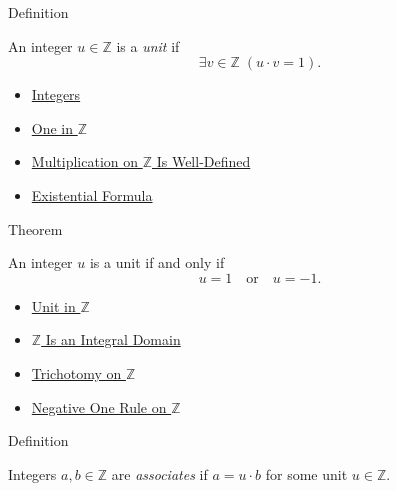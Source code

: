 \begin{definitionbox}{Definition}
\begin{definition}
\label{def:unit-in-z}
An integer $u\in\mathbb{Z}$ is a \emph{unit} if
\[
\exists v\in\mathbb{Z}\;(u\cdot v=1).
\]
\end{definition}
\end{definitionbox}

\begin{dependencies}
\begin{itemize}
  \item \hyperref[def:integers]{Integers}
  \item \hyperref[def:one-in-z]{One in $\mathbb{Z}$}
  \item \hyperref[thm:multiplication-on-z-well-defined]{Multiplication on $\mathbb{Z}$ Is Well-Defined}
  \item \hyperref[def:existential-q]{Existential Formula}
\end{itemize}
\end{dependencies}

\begin{theorembox}{Theorem}
\begin{theorem}
\label{thm:units-of-z-are-pm-one}
An integer $u$ is a unit if and only if
\[
u=1\quad\text{or}\quad u=-1.
\]
\end{theorem}
\end{theorembox}

\begin{dependencies}
\begin{itemize}
  \item \hyperref[def:unit-in-z]{Unit in $\mathbb{Z}$}
  \item \hyperref[thm:z-integral-domain]{$\mathbb{Z}$ Is an Integral Domain}
  \item \hyperref[thm:trichotomy-on-z]{Trichotomy on $\mathbb{Z}$}
  \item \hyperref[cor:negative-one-rule-on-z]{Negative One Rule on $\mathbb{Z}$}
\end{itemize}
\end{dependencies}

\begin{definitionbox}{Definition}
\begin{definition}
\label{def:associates-in-z}
Integers $a,b\in\mathbb{Z}$ are \emph{associates} if $a=u\cdot b$ for some
unit $u\in\mathbb{Z}$.
\end{definition}
\end{definitionbox}

